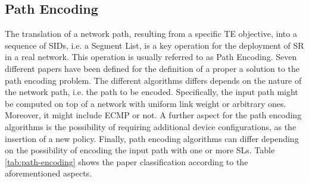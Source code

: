 \subsection{Path Encoding}
\label{sec:path}

The translation of a network path, resulting from a specific TE objective, into a sequence of SIDs, i.e. a Segment List, is a key operation for the deployment of SR in a real network. This operation is usually referred to as Path Encoding.
Seven different papers have been defined for the definition of a proper a solution to the path encoding problem.
The different algorithms differs depends on the nature of the network path, i.e. the path to be encoded.
Specifically, the input path might be computed on top of a network with uniform link weight or arbitrary ones.
Moreover, it might include ECMP or not.
A further aspect for the path encoding algorithms is the possibility of requiring additional device configurations, as the insertion of a new policy.
Finally, path encoding algorithms can differ depending on the possibility of encoding the input path with one or more SLs.
Table \ref{tab:path-encoding} shows the paper classification according to the aforementioned aspects.

